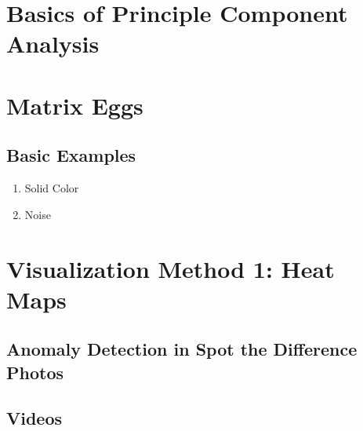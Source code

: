 \section{Basics of Principle Component Analysis}
\section{Matrix Eggs}
\subsection{Basic Examples}
\begin{enumerate}
	\item Solid Color
	\item Noise
\end{enumerate}
\section{Visualization Method 1: Heat Maps}
\subsection{Anomaly Detection in Spot the Difference Photos}
\subsection{Videos}


